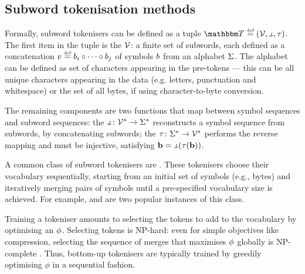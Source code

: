 
\subsection{Subword tokenisation methods}\label{sec:12-subwordmethods}

Formally, subword tokenisers can be defined as a tuple $\tokeniser \defeq (\vocab, \detok, \tok)$. The first item in the tuple is the  $\mathcal{V}$: a finite set of subwords, each defined as a concatenation $v \mathrel{\stackrel{\textnormal{\tiny def}}{=}} b_i \circ \cdots \circ b_j$ of symbols $b$ from an alphabet $\Sigma$. The alphabet can be defined as set of characters appearing in the pre-tokens --- this can be all unique characters appearing in the data (e.g. letters, punctuation and whitespace) or the set of all bytes, if using character-to-byte conversion. %

The remaining components are two functions that map between symbol sequences and subword sequences: the  $\detok\colon \vocab^* \to \alphabet^*$ reconstructs a symbol sequence from subwords, by concatenating subwords; the  $\tau\colon \Sigma^* \to \mathcal{V}^*$ performs the reverse mapping and must be injective, satisfying $\chvec = \detok(\tok(\chvec))$.

A common class of subword tokenisers are . These tokenisers choose their vocabulary sequentially, starting from an initial set of symbols (e.g., bytes) and iteratively merging pairs of symbols until a pre-specified vocabulary size is achieved. For example, \bpe \citep{gage1994new,sennrich-etal-2016-bpe} and \wordpiecefull \citep{schuster-nakajima-2012-voice} are two popular instances of this class.

Training a tokeniser amounts to selecting the tokens to add to the vocabulary by optimising an  $\phi$. Selecting tokens is NP-hard: even for simple objectives like compression, selecting the sequence of merges that maximises $\phi$ globally is NP-complete \citep{kozma-etal-2024-theoretical, whittington2024tokenisation}. Thus, bottom-up tokenisers are typically trained by greedily optimising $\phi$ in a sequential fashion.

